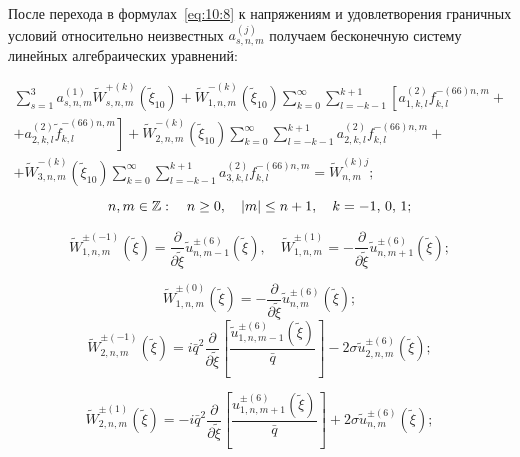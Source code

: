 После перехода в формулах~\eqref{eq:10:8} к напряжениям и удовлетворения граничных условий относительно неизвестных $a_{s,n,m}^{(j)}$ получаем бесконечную систему линейных алгебраических уравнений:

\begin{multline}
\sum\limits_{s = 1}^3 {a_{s,n,m}^{(1)}} \tilde W_{s,n,m}^{ + (k)}({\tilde \xi _{10}}) + \tilde W_{1,n,m}^{ - (k)}({\tilde \xi _{10}})\sum\limits_{k = 0}^\infty  {\sum\limits_{l =  - k - 1}^{k + 1} {\left[ {a_{1,k,l}^{(2)}f_{k,l}^{ - (66)n,m} + } \right.} } \\
\left. { + a_{2,k,l}^{(2)}\tilde f_{k,l}^{ - (66)n,m}} \right] + \tilde W_{2,n,m}^{ - (k)}({\tilde \xi _{10}})\sum\limits_{k = 0}^\infty  {\sum\limits_{l =  - k - 1}^{k + 1} {a_{2,k,l}^{(2)}} } f_{k,l}^{ - (66)n,m} + \\
+ \tilde W_{3,n,m}^{ - (k)}({\tilde \xi _{10}})\sum\limits_{k = 0}^\infty  {\sum\limits_{l =  - k - 1}^{k + 1} {a_{3,k,l}^{(2)}} } f_{k,l}^{ - (66)n,m} = \tilde W_{n,m}^{(k)j};
\end{multline}
$$
n,m \in\mathbb{Z}:\quad n \ge 0,\quad |m| \le n + 1,\quad k =  - 1,{\mkern 1mu} {\kern 1pt} 0,{\mkern 1mu} {\kern 1pt} 1;
$$

\begin{equation}
\tilde W_{1,n,m}^{ \pm ( - 1)}(\tilde \xi ) = \frac{\partial }{{\partial \tilde \xi }}\tilde u_{n,m - 1}^{ \pm (6)}(\tilde \xi ),\quad \tilde W_{1,n,m}^{ \pm (1)} =  - \frac{\partial }{{\partial \tilde \xi }}\tilde u_{n,m + 1}^{ \pm (6)}(\tilde \xi );
\end{equation}

\begin{equation}
\tilde W_{1,n,m}^{ \pm (0)}(\tilde \xi ) =  - \frac{\partial }{{\partial \tilde \xi }}\tilde u_{n,m}^{ \pm (6)}(\tilde \xi );
\end{equation}
\begin{equation}
\tilde W_{2,n,m}^{ \pm ( - 1)}(\tilde \xi ) = i{\bar q^2}\frac{\partial }{{\partial \tilde \xi }}\left[ {\frac{{\tilde u_{1,n,m - 1}^{ \pm (6)}(\tilde \xi )}}{{\bar q}}} \right] - 2\sigma \tilde u_{2,n,m}^{ \pm (6)}(\tilde \xi );
\end{equation}

\begin{equation}
\tilde W_{2,n,m}^{ \pm (1)}(\tilde \xi ) =  - i{\bar q^2}\frac{\partial }{{\partial \tilde \xi }}\left[ {\frac{{u_{1,n,m + 1}^{ \pm (6)}(\tilde \xi )}}{{\bar q}}} \right] + 2\sigma \tilde u_{n,m}^{ \pm (6)}(\tilde \xi );
\end{equation}

